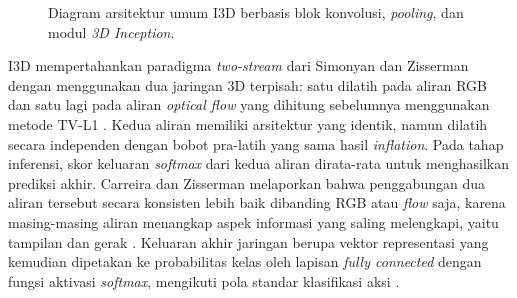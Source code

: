 \begin{figure}[H]
{{%
	}}
	\caption{Diagram arsitektur umum I3D berbasis blok konvolusi, \textit{pooling}, dan modul \textit{3D Inception}.}
	\label{fig:i3d-architecture}
\end{figure}

I3D mempertahankan paradigma \textit{two-stream} dari Simonyan dan Zisserman \cite{Simonyan2014TwoStream} dengan menggunakan dua jaringan 3D terpisah: satu dilatih pada aliran RGB dan satu lagi pada aliran \textit{optical flow} yang dihitung sebelumnya menggunakan metode TV-L1 \cite{Carreira2017I3D}. Kedua aliran memiliki arsitektur yang identik, namun dilatih secara independen dengan bobot pra-latih yang sama hasil \textit{inflation}. Pada tahap inferensi, skor keluaran \textit{softmax} dari kedua aliran dirata-rata untuk menghasilkan prediksi akhir. Carreira dan Zisserman melaporkan bahwa penggabungan dua aliran tersebut secara konsisten lebih baik dibanding RGB atau \textit{flow} saja, karena masing-masing aliran menangkap aspek informasi yang saling melengkapi, yaitu tampilan dan gerak \cite{Carreira2017I3D}. Keluaran akhir jaringan berupa vektor representasi yang kemudian dipetakan ke probabilitas kelas oleh lapisan \textit{fully connected} dengan fungsi aktivasi \textit{softmax}, mengikuti pola standar klasifikasi aksi \cite{Simonyan2014TwoStream,Carreira2017I3D}.\par


